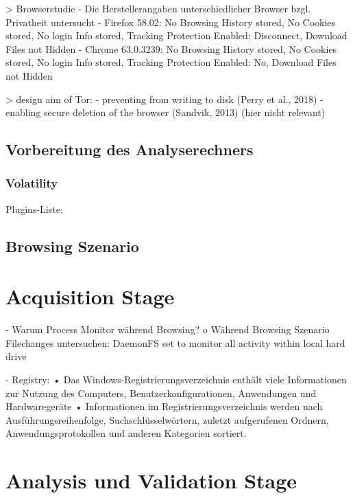 > Browserstudie \cite{Izzati.2022}
	- Die Herstellerangaben unterschiedlicher Browser bzgl. Privatheit untersucht
	- Firefox 58.02: No Browsing History stored, No Cookies stored, No login Info stored, Tracking Protection Enabled: Disconnect, Download Files not Hidden
	- Chrome 63.0.3239: No Browsing History stored, No Cookies stored, No login Info stored, Tracking Protection Enabled: No, Download Files not Hidden

> design aim of Tor: \cite{Muir.2019}
	- preventing from writing to disk (Perry et al., 2018) 
	- enabling secure deletion of the browser (Sandvik, 2013) (hier nicht relevant)


\subsection{Vorbereitung des Analyserechners}

\subsubsection*{Volatility}
Plugins-Liste: \cite{Dayalamurthy.2013}

\subsection{Browsing Szenario}


\section{Acquisition Stage}
- Warum Process Monitor während Browsing?
	o Während Browsing Szenario Filechanges untersuchen: DaemonFS set to monitor all activity within local hard drive\cite{Ohana.2013}
	
- Registry: \cite{Rochmadi.2017}
	•	Das Windows-Registrierungsverzeichnis enthält viele Informationen zur Nutzung des Computers, Benutzerkonfigurationen, Anwendungen und Hardwaregeräte
	•	Informationen im Registrierungsverzeichnis werden nach Ausführungsreihenfolge, Suchschlüsselwörtern, zuletzt aufgerufenen Ordnern, Anwendungsprotokollen und anderen Kategorien sortiert.
	
	

\section{Analysis und Validation Stage}
\Blindtext[1][4]
